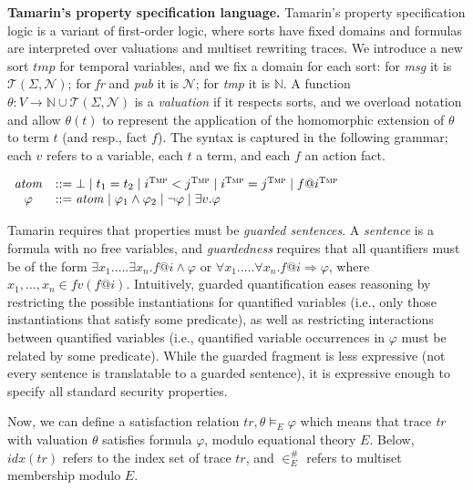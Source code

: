 \documentclass{article}
\theoremstyle{definition}
\begin{document}
\textbf{Tamarin's property specification language.}
Tamarin's property specification logic is a variant of first-order logic, where sorts have fixed domains and formulas are interpreted over valuations and multiset rewriting traces. 
We introduce a new sort $\mathit{tmp}$ for temporal variables, and we fix a domain for each sort: for \textit{msg} it is $\mathcal{T}(\Sigma, \mathcal{N})$; for \textit{fr} and \textit{pub} it is $\mathcal{N}$; for \textit{tmp} it is $\mathbb{N}$. A function $\theta : V \rightarrow \mathbb{N} \cup \mathcal{T}(\Sigma, \mathcal{N})$ is a \emph{valuation} if it respects sorts, and we overload notation and allow $\theta(t)$ to represent the application of the homomorphic extension of $\theta$ to term $t$ (and resp., fact $f$). The syntax is captured in the following grammar; each $v$ refers to a variable, each $t$ a term, and each $f$ an action fact.

$
\begin{array}{cl}
  \mathit{atom} & ::= \bot \mid t_1 = t_2 \mid i^{\textsc{Tmp}} < j^{\textsc{Tmp}} \mid i^{\textsc{Tmp}} = j^{\textsc{Tmp}} \mid f@i^{\textsc{Tmp}}   \\
  \varphi & ::=   \mathit{atom} \mid \varphi_1 \land \varphi_2 \mid \neg \varphi \mid \exists v. \varphi \\
\end{array}
$

Tamarin requires that properties must be \emph{guarded sentences}. 
A \emph{sentence} is a formula with no free variables, 
and \emph{guardedness} requires that all quantifiers must be of the form 
$\exists x_1. \dots. \exists x_n.f@i \land \varphi$ or 
$\forall x_1.\dots.\forall x_n.f@i \Rightarrow \varphi$, where $x_1,\dots,x_n \in \mathit{fv}(f@i)$. 
Intuitively, guarded quantification eases reasoning by restricting the possible instantiations for quantified variables 
(i.e., only those instantiations that satisfy some predicate), 
as well as restricting interactions between quantified variables 
(i.e., quantified variable occurrences in $\varphi$ must be related by some predicate).
While the guarded fragment is less expressive (not every sentence is translatable to a guarded sentence), 
it is expressive enough to specify all standard security properties.

Now, we can define a satisfaction relation $\mathit{tr}, \theta \models_E \varphi$ which means that trace \emph{tr} with valuation $\theta$ satisfies formula $\varphi$, modulo equational theory $E$. Below, $\mathit{idx}(\mathit{tr})$ refers to the index set of trace $\mathit{tr}$, and $\in^\#_E$ refers to multiset membership modulo $E$.
\end{document}
